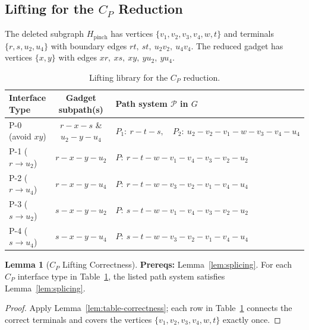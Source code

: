 \documentclass[12pt]{article}
\theoremstyle{definition}
\newtheorem{lemma}[theorem]{Lemma}
\begin{document}
\subsection{Lifting for the \texorpdfstring{$C_P$}{CP} Reduction}
\label{subsec:lifting-pinch}

The deleted subgraph $H_{\text{pinch}}$ has vertices $\{v_1,v_2,v_3,v_4,w,t\}$ and terminals
$\{r,s,u_2,u_4\}$ with boundary edges $rt,\ st,\ u_2v_2,\ u_4v_4$.
The reduced gadget has vertices $\{x,y\}$ with edges
$xr,\ xs,\ xy,\ yu_2,\ yu_4$.

\begin{table}[ht]
\centering
\begin{center}
\small
\begin{tabularx}{\textwidth}{|l|c|X|}
\hline
\textbf{Interface Type} &
\textbf{Gadget subpath(s)} &
\textbf{Path system $\mathcal{P}$ in $G$} \\
\hline
P-0 (avoid $xy$) &
$r\!-\!x\!-\!s$ \& $u_2\!-\!y\!-\!u_4$ &
$P_1:\ r\!-\!t\!-\!s,\quad P_2:\ u_2\!-\!v_2\!-\!v_1\!-\!w\!-\!v_3\!-\!v_4\!-\!u_4$\\
\hline
P-1 ($r \to u_2$) &
$r\!-\!x\!-\!y\!-\!u_2$ &
$P:\ r\!-\!t\!-\!w\!-\!v_1\!-\!v_4\!-\!v_3\!-\!v_2\!-\!u_2$\\
\hline
P-2 ($r \to u_4$) &
$r\!-\!x\!-\!y\!-\!u_4$ &
$P:\ r\!-\!t\!-\!w\!-\!v_3\!-\!v_2\!-\!v_1\!-\!v_4\!-\!u_4$\\
\hline
P-3 ($s \to u_2$) &
$s\!-\!x\!-\!y\!-\!u_2$ &
$P:\ s\!-\!t\!-\!w\!-\!v_1\!-\!v_4\!-\!v_3\!-\!v_2\!-\!u_2$\\
\hline
P-4 ($s \to u_4$) &
$s\!-\!x\!-\!y\!-\!u_4$ &
$P:\ s\!-\!t\!-\!w\!-\!v_3\!-\!v_2\!-\!v_1\!-\!v_4\!-\!u_4$\\
\hline
\end{tabularx}
\end{center}
\caption{Lifting library for the $C_P$ reduction.}
\label{tab:lifting-pinch}
\end{table}

\begin{lemma}[$C_P$ Lifting Correctness]
\label{lem:lifting-pinch}
\textbf{Prereqs:} Lemma~\ref{lem:splicing}.
For each $C_P$ interface type in Table~\ref{tab:lifting-pinch}, the listed
path system satisfies Lemma~\ref{lem:splicing}.
\end{lemma}

\begin{proof}
Apply Lemma~\ref{lem:table-correctness}; each row in Table~\ref{tab:lifting-pinch} connects the correct terminals and covers the vertices $\{v_1,v_2,v_3,v_4,w,t\}$ exactly once.
\end{proof}
\end{document}

